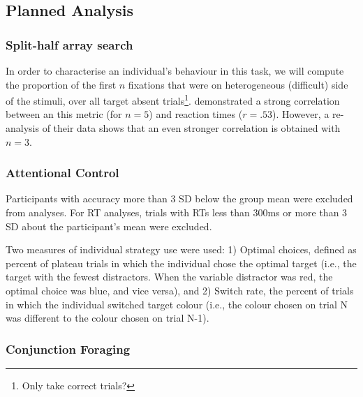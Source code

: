 \documentclass[]{rsos}%
\begin{document}

\subsection{Planned Analysis}


\subsubsection{Split-half array search}

In order to characterise an individual's behaviour in this task, we will compute the proportion of the first $n$ fixations that were on heterogeneous (difficult) side of the stimuli, over all target absent trials\footnote{Only take correct trials?}. \cite{nowakowsak2017} demonstrated a strong correlation between an this metric (for $n=5$) and reaction times ($r=.53$). However, a re-analysis of their data shows that an even stronger correlation is obtained with $n=3$.

\subsubsection{Attentional Control}

Participants with accuracy more than 3 SD below the group mean were excluded from analyses. For RT analyses, trials with RTs less than 300ms or more than 3 SD about the participant's mean were excluded. 

Two measures of individual strategy use were used: 1) Optimal choices, defined as percent of plateau trials in which the individual chose the optimal target (i.e., the target with the fewest distractors. When the variable distractor was red, the optimal choice was blue, and vice versa), and 2) Switch rate, the percent of trials in which the individual switched target colour (i.e., the colour chosen on trial N was different to the colour chosen on trial N-1).  

\subsubsection{Conjunction Foraging}
\end{document}
